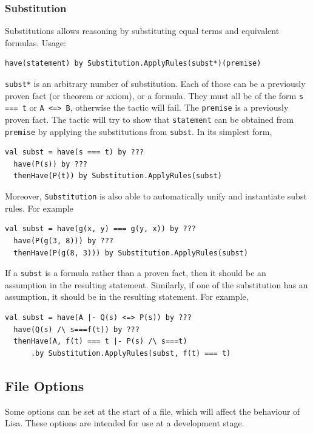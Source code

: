 \subsubsection*{Substitution}
Substitutions allows reasoning by substituting equal terms and equivalent formulas. Usage:
\begin{lstlisting}[language=lisa]
  have(statement) by Substitution.ApplyRules(subst*)(premise)
\end{lstlisting}

\lstinline|subst*| is an arbitrary number of substitution. Each of those can be a previously proven fact (or theorem or axiom), or a formula. They must all be of the form \lstinline|s === t| or \lstinline|A <=> B|, otherwise the tactic will fail. The \lstinline|premise| is a previously proven fact. The tactic will try to show that \lstinline|statement| can be obtained from \lstinline|premise| by applying the substitutions from \lstinline|subst|. In its simplest form,
\begin{lstlisting}[language=lisa]
  val subst = have(s === t) by ???
  have(P(s)) by ???
  thenHave(P(t)) by Substitution.ApplyRules(subst)
\end{lstlisting}

Moreover, \lstinline|Substitution| is also able to  automatically unify and instantiate subst rules. For example

\begin{lstlisting}[language=lisa]
  val subst = have(g(x, y) === g(y, x)) by ???
  have(P(g(3, 8))) by ???
  thenHave(P(g(8, 3))) by Substitution.ApplyRules(subst)
\end{lstlisting}

If a \lstinline|subst| is a formula rather than a proven fact, then it should be an assumption in the resulting statement. Similarly, if one of the substitution has an assumption, it should be in the resulting statement. For example,

\begin{lstlisting}[language=lisa]
  val subst = have(A |- Q(s) <=> P(s)) by ???
  have(Q(s) /\ s===f(t)) by ???
  thenHave(A, f(t) === t |- P(s) /\ s===t)
      .by Substitution.ApplyRules(subst, f(t) === t)
\end{lstlisting}

\subsection*{File Options}
Some options can be set at the start of a file, which will affect the behaviour of Lisa. These options are intended for use at a development stage.

